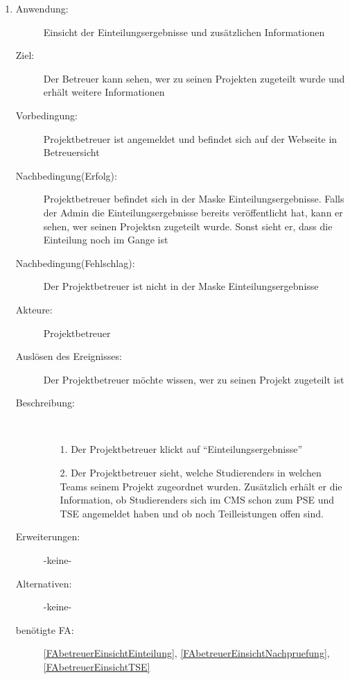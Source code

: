 \documentclass[parskip=full]{scrartcl}
\newcommand{\swtLabel}[1]{\textbf{/#1\arabic*0/}}
\begin{document}
\begin{enumerate} [label=\swtLabel{B}]
  
  \item \label{UCbetreuerEinsichtEinteilungProjekt}
  \begin{description}
  	\item[Anwendung:] Einsicht der Einteilungsergebnisse und zusätzlichen Informationen
  	\item[Ziel:] Der Betreuer kann sehen, wer zu seinen Projekten zugeteilt wurde und erhält weitere Informationen
  	\item[Vorbedingung:] \gls{Projektbetreuer} ist angemeldet und befindet sich auf der
  	Webseite in Betreuersicht  %
  	\item[Nachbedingung(Erfolg):] \gls{Projektbetreuer} befindet sich in der Maske
  	Einteilungsergebnisse. %
  	Falls der Admin die Einteilungsergebnisse bereits veröffentlicht hat, kann er
  	sehen, wer seinen \glspl{Projekt}n zugeteilt wurde. Sonst sieht er, dass die Einteilung
  	noch im Gange ist
  	\item[Nachbedingung(Fehlschlag):] Der \gls{Projektbetreuer} ist nicht in der
  	Maske Einteilungsergebnisse
  	\item[Akteure:] \gls{Projektbetreuer}
  	\item[Auslösen des Ereignisses:] Der \gls{Projektbetreuer} möchte wissen, wer zu seinen Projekt zugeteilt ist
  	\item[Beschreibung:]~
  	\begin{enumerate}
  		\item[1.] Der \gls{Projektbetreuer} klickt auf \enquote{Einteilungsergebnisse} 
		\item[2.] Der \gls{Projektbetreuer} sieht, welche \glspl{Studierender} in welchen Teams seinem Projekt zugeordnet wurden. Zusätzlich erhält er die Information, ob \glspl{Studierender} sich im CMS schon zum PSE und TSE angemeldet haben und ob noch Teilleistungen offen sind.
  	\end{enumerate}
  	\item[Erweiterungen:] -keine-
  	
  	\item[Alternativen:] -keine-
  	
  	\item[benötigte FA:] \ref{FAbetreuerEinsichtEinteilung}, \ref{FAbetreuerEinsichtNachpruefung}, \ref{FAbetreuerEinsichtTSE}
  \end{description}
   

\end{enumerate}
\end{document}
